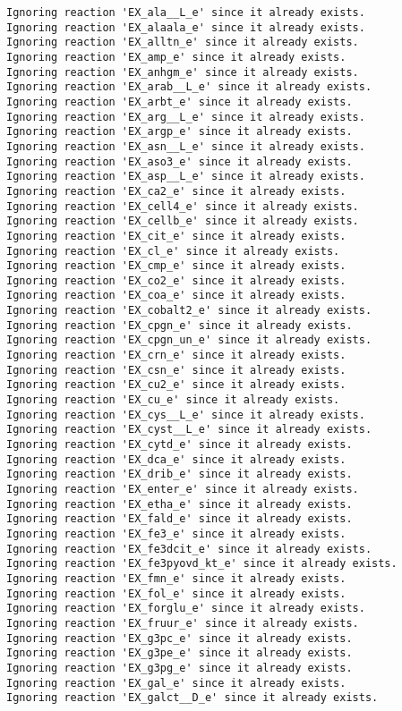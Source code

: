 \documentclass[
  letterpaper,
  DIV=11,
  numbers=noendperiod]{scrartcl}
\begin{document}
\begin{verbatim}
Ignoring reaction 'EX_ala__L_e' since it already exists.
Ignoring reaction 'EX_alaala_e' since it already exists.
Ignoring reaction 'EX_alltn_e' since it already exists.
Ignoring reaction 'EX_amp_e' since it already exists.
Ignoring reaction 'EX_anhgm_e' since it already exists.
Ignoring reaction 'EX_arab__L_e' since it already exists.
Ignoring reaction 'EX_arbt_e' since it already exists.
Ignoring reaction 'EX_arg__L_e' since it already exists.
Ignoring reaction 'EX_argp_e' since it already exists.
Ignoring reaction 'EX_asn__L_e' since it already exists.
Ignoring reaction 'EX_aso3_e' since it already exists.
Ignoring reaction 'EX_asp__L_e' since it already exists.
Ignoring reaction 'EX_ca2_e' since it already exists.
Ignoring reaction 'EX_cell4_e' since it already exists.
Ignoring reaction 'EX_cellb_e' since it already exists.
Ignoring reaction 'EX_cit_e' since it already exists.
Ignoring reaction 'EX_cl_e' since it already exists.
Ignoring reaction 'EX_cmp_e' since it already exists.
Ignoring reaction 'EX_co2_e' since it already exists.
Ignoring reaction 'EX_coa_e' since it already exists.
Ignoring reaction 'EX_cobalt2_e' since it already exists.
Ignoring reaction 'EX_cpgn_e' since it already exists.
Ignoring reaction 'EX_cpgn_un_e' since it already exists.
Ignoring reaction 'EX_crn_e' since it already exists.
Ignoring reaction 'EX_csn_e' since it already exists.
Ignoring reaction 'EX_cu2_e' since it already exists.
Ignoring reaction 'EX_cu_e' since it already exists.
Ignoring reaction 'EX_cys__L_e' since it already exists.
Ignoring reaction 'EX_cyst__L_e' since it already exists.
Ignoring reaction 'EX_cytd_e' since it already exists.
Ignoring reaction 'EX_dca_e' since it already exists.
Ignoring reaction 'EX_drib_e' since it already exists.
Ignoring reaction 'EX_enter_e' since it already exists.
Ignoring reaction 'EX_etha_e' since it already exists.
Ignoring reaction 'EX_fald_e' since it already exists.
Ignoring reaction 'EX_fe3_e' since it already exists.
Ignoring reaction 'EX_fe3dcit_e' since it already exists.
Ignoring reaction 'EX_fe3pyovd_kt_e' since it already exists.
Ignoring reaction 'EX_fmn_e' since it already exists.
Ignoring reaction 'EX_fol_e' since it already exists.
Ignoring reaction 'EX_forglu_e' since it already exists.
Ignoring reaction 'EX_fruur_e' since it already exists.
Ignoring reaction 'EX_g3pc_e' since it already exists.
Ignoring reaction 'EX_g3pe_e' since it already exists.
Ignoring reaction 'EX_g3pg_e' since it already exists.
Ignoring reaction 'EX_gal_e' since it already exists.
Ignoring reaction 'EX_galct__D_e' since it already exists.

\end{verbatim}
\end{document}
